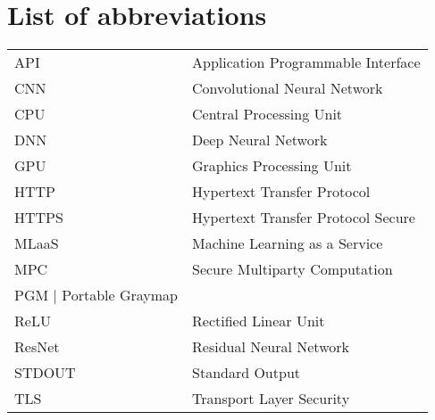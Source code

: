 \chapter*{List of abbreviations}
\begin{table}[!h]
	\begin{tabular}{ll}
		API			& Application Programmable Interface\\
		CNN			&	Convolutional Neural Network\\
		CPU			& Central Processing Unit\\
		DNN 		&	Deep Neural Network\\
		GPU 		&	Graphics Processing Unit\\
		HTTP		&	Hypertext Transfer Protocol\\
		HTTPS		&	Hypertext Transfer Protocol Secure\\
		MLaaS		&	Machine Learning as a Service\\
		MPC			&	Secure Multiparty Computation\\
		PGM 		|	Portable Graymap\\
		ReLU		&	Rectified Linear Unit\\
		ResNet	&	Residual Neural Network\\
		STDOUT	&	Standard Output\\
		TLS			&	Transport Layer Security\\
	\end{tabular}
\end{table}
